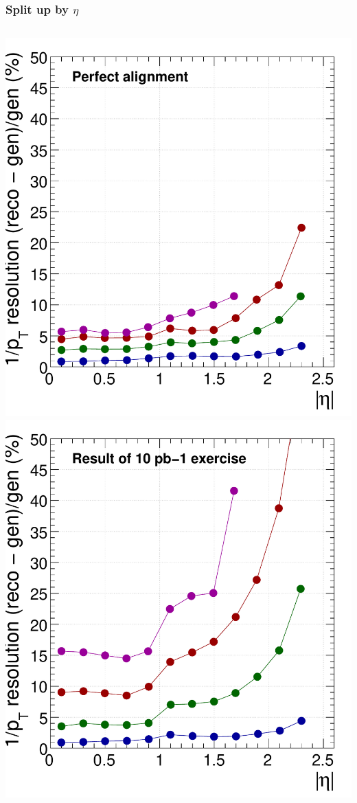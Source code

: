 \documentclass[compress]{beamer}
\begin{document}
\begin{frame}
\frametitle{Split up by $\eta$}

\begin{columns}
\includegraphics[width=\linewidth]{curvature_byeta_ideal.pdf}
\includegraphics[width=\linewidth]{curvature_byeta_csa.pdf}

\end{columns}
\end{frame}
\end{document}
